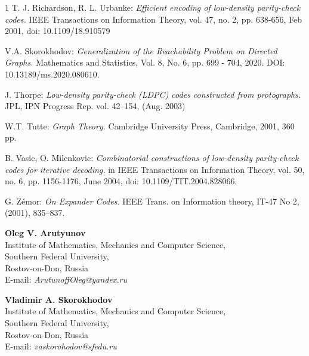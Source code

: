 \documentclass[leqno]{aadmbook}
\newcounter{definition}[section]
\begin{document}
\begin{thebibliography}{1}
{\small {\sc T. J. Richardson, R. L. Urbanke: }{\it Efficient encoding of low-density parity-check codes.} IEEE Transactions on Information Theory, vol. 47, no. 2, pp. 638-656, Feb 2001, doi: 10.1109/18.910579 }

{\small {\sc V.A. Skorokhodov: }{\it Generalization of the Reachability Problem on Directed Graphs.} Mathematics and Statistics, Vol. 8, No. 6, pp. 699 - 704, 2020. DOI: 10.13189/ms.2020.080610.}

{\small {\sc J. Thorpe:} {\it Low-density parity-check (LDPC) codes constructed from protographs.} JPL, IPN Progress Rep. vol. 42–154, (Aug. 2003)}

{\small {\sc W.T. Tutte: }{\it Graph Theory.} Cambridge University Press, Cambridge, 2001, 360 pp.}

{\small {\sc B. Vasic, O. Milenkovic: }{\it Combinatorial constructions of low-density parity-check codes for iterative decoding.} in IEEE Transactions on Information Theory, vol. 50, no. 6, pp. 1156-1176, June 2004, doi: 10.1109/TIT.2004.828066. }

{\small {\sc G. Zémor:} {\it On Expander Codes.} IEEE Trans. on Information theory, IT-47 No 2, (2001), 835--837.}

\end{thebibliography}

\vspace{1cc}

\noindent
{\bf Oleg V. Arutyunov}\\
Institute of Mathematics, Mechanics and Computer Science,\\
Southern Federal University,\\
Rostov-on-Don, Russia\\
E-mail: {\it ArutunoffOleg@yandex.ru}

\vspace{0.1cc}

\noindent
{\bf Vladimir A. Skorokhodov}\\
Institute of Mathematics, Mechanics and Computer Science,\\
Southern Federal University,\\
Rostov-on-Don, Russia\\
E-mail: {\it vaskorohodov@sfedu.ru}
\end{document}
